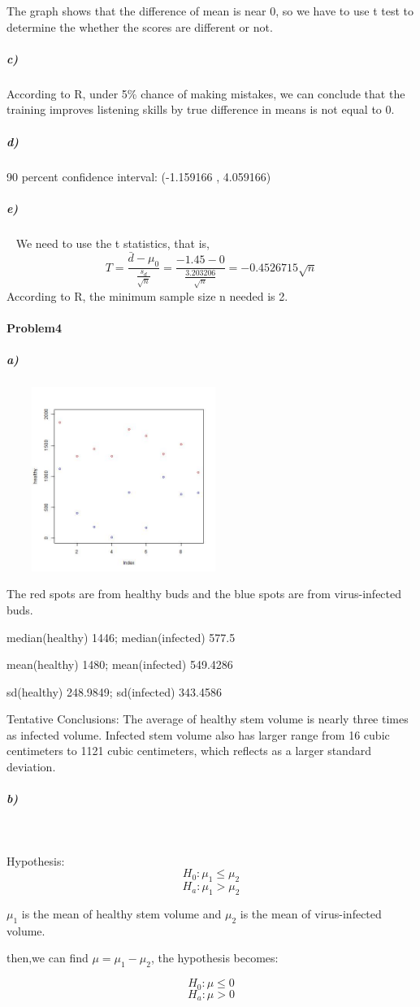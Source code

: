 \documentclass{article}
\begin{document}
The graph shows that the difference of mean is near 0, so we have to use t test to determine the whether the scores are different or not.
\subparagraph{c)}
According to R, under 5\% chance of making mistakes, we can conclude that the training improves listening skills by true difference in means is not equal to 0.
\subparagraph{d)}
90 percent confidence interval:
 (-1.159166  , 4.059166)
\subparagraph{e)}~{}
We need to use the t statistics, that is,\[T=\frac{\bar{d}-\mu_0}{\frac{s_d}{\sqrt{n}}}=\frac{-1.45-0}{\frac{3.203206}{\sqrt{n}}}= −0.4526715\sqrt{n} \]
According to R, the minimum sample size n needed is 2.
\paragraph{Problem4}
\subparagraph{a)}~{}
\newline
\includegraphics[height=6cm,width=7cm]{4a.jpg}

The red spots are from healthy buds and the blue spots are from virus-infected buds.

median(healthy) 1446;
median(infected) 577.5

mean(healthy) 1480;
mean(infected) 549.4286

sd(healthy) 248.9849;
sd(infected) 343.4586

Tentative Conclusions: The average of healthy stem volume is nearly three times as infected volume. Infected stem volume also has larger range from 16 cubic centimeters to 1121 cubic centimeters, which reflects as a larger standard deviation.
\subparagraph{b)}~{}

Hypothesis:\[H_0:\mu_1\leq \mu_2\] \[H_a:\mu_1> \mu_2\]

$\mu_1$ is the mean of healthy stem volume and $\mu_2$ is the mean of virus-infected volume.

then,we can find $\mu=\mu_1-\mu_2$, the hypothesis becomes:

\[H_0:\mu\leq 0\] \[H_a:\mu>0\]
\end{document}
